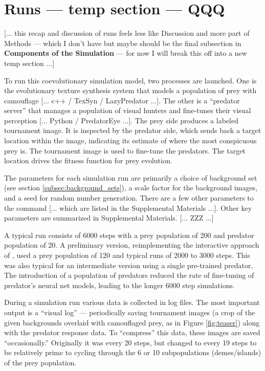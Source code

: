\documentclass[acmtog]{acmart}
\begin{document}
\par


\section{Runs — temp section — QQQ}
[... this recap and discussion of runs feels less like Discussion and more part of Methods — which I don't have but maybe should be the final subsection in \textbf{Components of the Simulation} — for now I will break this off into a new temp section ...]
\par
To run this coevolutionary simulation model, two processes are launched. One is the evolutionary texture synthesis system that models a population of prey with camouflage [... c++ / TexSyn / LazyPredator ...]. The other is a “predator server” that manages a population of visual hunters and fine-tunes their visual perception [... Python / PredatorEye ...]. The prey side produces a labeled tournament image. It is inspected by the predator side, which sends back a target location within the image, indicating its estimate of where the most conspicuous prey is. The tournament image is used to fine-tune the predators. The target location drives the fitness function for prey evolution.
\par
The parameters for each simulation run are primarily a choice of background set (see section \ref{subsec:background_sets}), a scale factor for the background images, and a seed for random number generation. There are a few other parameters to the command [... which are listed in the Supplemental Materials ...]. Other key parameters are summarized in Supplemental Materials. [... ZZZ ...]
\par
A typical run consists of 6000 steps with a prey population of 200 and predator population of 20. A preliminary version, reimplementing the interactive approach of \citet{reynolds_iec_2011}, used a prey population of 120 and typical runs of 2000 to 3000 steps. This was also typical for an intermediate version using a single pre-trained predator. The introduction of a population of predators reduced the rate of fine-tuning of predator's neural net models, leading to the longer 6000 step simulations.
\par
During a simulation run various data is collected in log files. The most important output is a “visual log” — periodically saving tournament images (a crop of the given backgrounds overlaid with camouflaged prey, as in Figure \ref{fig:teaser}) along with the predator response data. To “compress” this data, these images are saved “occasionally.” Originally it was every 20 steps, but changed to every 19 steps to be relatively prime to cycling through the 6 or 10 subpopulations (demes/islands) of the prey population.
\par
\end{document}
